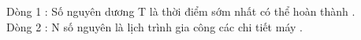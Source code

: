 Dòng 1 : Số nguyên dương T là thời điểm sớm nhất có thể hoàn thành .   
\\   Dòng 2 : N số nguyên là lịch trình gia công các chi tiết máy .  

\
